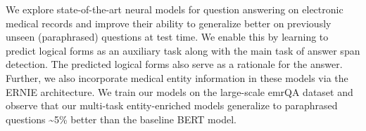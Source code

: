We explore state-of-the-art neural models for question answering on electronic medical records and improve their ability to generalize better on previously unseen (paraphrased) questions at test time. We enable this by learning to predict logical forms as an auxiliary task along with the main task of answer span detection. The predicted logical forms also serve as a rationale for the answer. Further, we also incorporate medical entity information in these models via the ERNIE architecture. We train our models on the large-scale emrQA dataset and observe that our multi-task entity-enriched models generalize to paraphrased questions {\textasciitilde}5\% better than the baseline BERT model.

